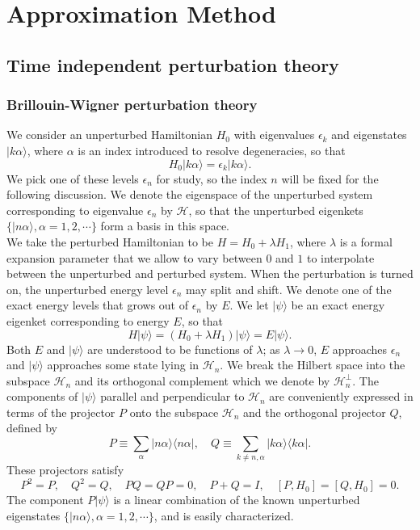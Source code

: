 \chapter{Approximation Method}
\section{Time independent perturbation theory}
\subsection{Brillouin-Wigner perturbation theory}
We consider an unperturbed Hamiltonian $H_0$ with eigenvalues $\epsilon_k$ and eigenstates $|k\alpha\rangle$, where $\alpha$ is an index introduced to resolve degeneracies, so that
\[H_0 |k\alpha\rangle = \epsilon_k |k\alpha\rangle.\]
We pick one of these levels $\epsilon_n$ for study, so the index $n$ will be fixed for the following discussion. We denote the eigenspace of the unperturbed system corresponding to eigenvalue  $\epsilon_n$ by $\mathcal{H}$, so that the unperturbed eigenkets
$\{ |n\alpha\rangle, \alpha = 1,2,\cdots\}$ form a basis in this space.\\
We take the perturbed Hamiltonian to be $H = H_0 + \lambda H_1$, where $\lambda$ is a formal expansion parameter that we allow to vary between $0$ and $1$ to interpolate between the unperturbed and perturbed system. When the perturbation is turned on, the unperturbed energy level $\epsilon_n$ may split and shift. We denote one of the exact energy levels that grows out of $\epsilon_n$ by $E$. We let $|\psi\rangle$ be an exact energy eigenket corresponding to energy $E$, so that
\[H|\psi\rangle = (H_0 + \lambda H_1)|\psi\rangle = E|\psi\rangle.\]
Both $E$ and $|\psi\rangle$ are understood to be functions of $\lambda$; as $\lambda \to 0$, $E$ approaches $\epsilon_n$ and $|\psi\rangle$ approaches some state lying in $\mathcal{H}_n$. We break the Hilbert space into the subspace $\mathcal{H}_n$ and its orthogonal complement which we denote by $\mathcal{H}_n^{\bot}$. The components of $|\psi\rangle$ parallel and perpendicular to $\mathcal{H}_n$ are conveniently expressed in terms of the projector $P$ onto the subspace $\mathcal{H}_n$ and the orthogonal projector $Q$, defined by
\[P \equiv \sum_{\alpha} |n\alpha\rangle \langle n\alpha| , \quad Q \equiv \sum_{k \neq n,\alpha} |k\alpha\rangle \langle k\alpha|.\]
These projectors satisfy
\[P^2=P , \quad Q^2=Q , \quad PQ=QP=0 , \quad P+Q=I , \quad [P,H_0]=[Q,H_0]=0.\]
The component $P|\psi\rangle$ is a linear combination of the known unperturbed eigenstates $\{ |n\alpha\rangle, \alpha = 1,2,\cdots\}$, and is easily characterized. 
